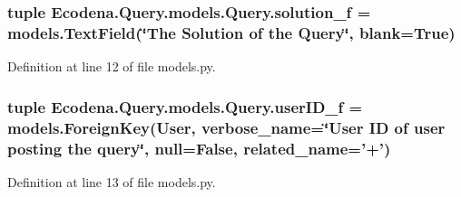 \hypertarget{class_ecodena_1_1_query_1_1models_1_1_query_aa5784dfc285de57ac58e20358ec86136}{
\subsubsection[{solution\_\-f}]{\setlength{\rightskip}{0pt plus 5cm}tuple {\bf Ecodena.Query.models.Query.solution\_\-f} = models.TextField(\char`\"{}The Solution of the {\bf Query}\char`\"{}, blank=True)}}
\label{de/d81/class_ecodena_1_1_query_1_1models_1_1_query_aa5784dfc285de57ac58e20358ec86136}


Definition at line 12 of file models.py.

\hypertarget{class_ecodena_1_1_query_1_1models_1_1_query_af6d91b41546f1d338987e4072357700c}{
\subsubsection[{userID\_\-f}]{\setlength{\rightskip}{0pt plus 5cm}tuple {\bf Ecodena.Query.models.Query.userID\_\-f} = models.ForeignKey(User, verbose\_\-name=\char`\"{}User ID of user posting the query\char`\"{}, null=False, related\_\-name='+')}}
\label{de/d81/class_ecodena_1_1_query_1_1models_1_1_query_af6d91b41546f1d338987e4072357700c}


Definition at line 13 of file models.py.

\hypertarget{class_ecodena_1_1_query_1_1models_1_1_query_a7aca73a76e3660ca990174870404f804}{
\subsubsection[{userID\_\-f}]{}}
\label{de/d81/class_ecodena_1_1_query_1_1models_1_1_query_a7aca73a76e3660ca990174870404f804}


